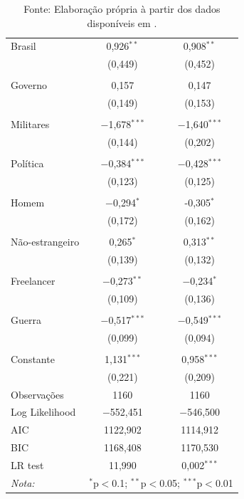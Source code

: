 \documentclass[12pt,
               openright,
               oneside,
               a4paper,
							 section=TITLE,     %
               subsection=Title,  %
               english,brazil]{article}
\begin{document}
\begin{table}[H]
\begin{tabular}{lcc}
 Brasil & 0,926$^{**}$ & 0,908$^{**}$\\ 
  & (0,449) & (0,452)\\ & \\
 Governo & 0,157 & 0,147\\ 
  & (0,149) & (0,153)\\ & \\
 Militares & $-$1,678$^{***}$ & $-$1,640$^{***}$\\ 
  & (0,144) & (0,202)\\ & \\
 Política & $-$0,384$^{***}$ & $-$0,428$^{***}$\\ 
  & (0,123) & (0,125)\\ & \\
 Homem & $-$0,294$^{*}$ & -0,305$^{*}$\\ 
  & (0,172) & (0,162)\\ & \\
 Não-estrangeiro & 0,265$^{*}$ & 0,313$^{**}$\\ 
  & (0,139) & (0,132)\\ & \\
 Freelancer & $-$0,273$^{**}$ & $-$0,234$^{*}$\\ 
  & (0,109) & (0,136)\\ & \\
 Guerra & $-$0,517$^{***}$ & $-$0,549$^{***}$\\ 
  & (0,099) & (0,094)\\ & \\
  Constante & 1,131$^{***}$ & 0,958$^{***}$\\ 
  & (0,221) & (0,209) \\
\bottomrule   
Observações & 1160 & 1160\\ 
Log Likelihood & $-$552,451 & $-$546,500 \\ 
AIC & 1122,902 & 1114,912 \\ 
BIC & 1168,408 & 1170,530 \\ 
LR test & 11,990 & 0,002$^{***}$ \\ 
\bottomrule 
\bottomrule 
\textit{Nota:}  & \multicolumn{2}{r}{$^{*}$p$<$0.1; $^{**}$p$<$0.05; $^{***}$p$<$0.01} \\ 
\end{tabular}
\caption*{Fonte: Elaboração própria à partir dos dados disponíveis em \cite{CPJ2020}.}
\end{table} 
\end{document}
